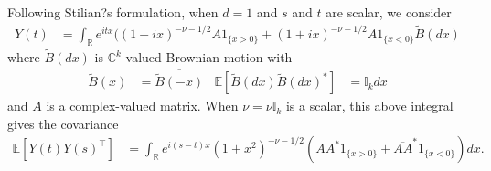 \documentclass[11pt]{article}
\begin{document}
Following Stilian?s formulation, when $d=1$ and $s$ and $t$ are scalar, we consider \begin{align*}
Y(t) &= \int_\mathbb{R}e^{itx}((1 + ix)^{-\nu - 1/2} A1_{\{x > 0\}} + (1 + ix)^{-\nu - 1/2} \overline{A}1_{\{x < 0\}}\tilde{B} (dx)
\end{align*}where $\tilde{B}(dx)$ is $\mathbb{C}^k$-valued Brownian motion with \begin{align*}
\tilde{B}(x) &= \overline{\tilde{B}(-x)} &  \mathbb{E}[\tilde{B}(dx) \tilde{B}(dx)^*] &= \mathbb{I}_k dx
\end{align*}and $A$ is a complex-valued matrix. When $\nu = \nu \mathbb{I}_k$ is a scalar, this above integral gives the covariance \begin{align*}
\mathbb{E}[ Y(t) Y(s)^\top ] &= \int_{\mathbb{R}} e^{i(s-t)x}(1+x^2)^{-\nu-1/2}(AA^*1_{\{x >0\}} + \overline{AA}^*1_{\{x < 0\}})dx.
\end{align*}
%
%
%
\end{document}
